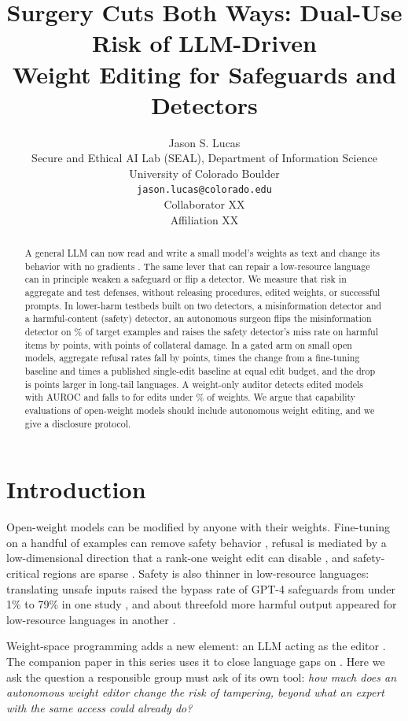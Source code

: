 \documentclass[11pt]{article}
\title{Surgery Cuts Both Ways: Dual-Use Risk of LLM-Driven\\Weight Editing for Safeguards and Detectors}
\author{Jason S. Lucas \\
  Secure and Ethical AI Lab (SEAL), Department of Information Science \\
  University of Colorado Boulder \\
  \texttt{jason.lucas@colorado.edu} \\\And
  Collaborator XX \\
  Affiliation XX}
\begin{document}
\maketitle

\begin{abstract}
A general LLM can now read and write a small model's weights as text and change its behavior with no gradients \citep{takehi2026weightspace}. The same lever that can repair a low-resource language can in principle weaken a safeguard or flip a detector. We measure that risk in aggregate and test defenses, without releasing procedures, edited weights, or successful prompts. In lower-harm testbeds built on two detectors, a \bluff{} misinformation detector and a harmful-content (safety) detector, an autonomous surgeon flips the misinformation detector on \xx{}\% of target examples and raises the safety detector's miss rate on harmful items by \xx{} points, with \xx{} points of collateral damage. In a gated arm on small open models, aggregate refusal rates fall by \xx{} points, \xx{} times the change from a fine-tuning baseline and \xx{} times a published single-edit baseline at equal edit budget, and the drop is \xx{} points larger in long-tail languages. A weight-only auditor detects edited models with AUROC \xx{} and falls to \xx{} for edits under \xx{}\% of weights. We argue that capability evaluations of open-weight models should include autonomous weight editing, and we give a disclosure protocol.
\end{abstract}

\section{Introduction}
Open-weight models can be modified by anyone with their weights. Fine-tuning on a handful of examples can remove safety behavior \citep{qi2024finetuning}, refusal is mediated by a low-dimensional direction that a rank-one weight edit can disable \citep{arditi2024refusal}, and safety-critical regions are sparse \citep{wei2024brittleness}. Safety is also thinner in low-resource languages: translating unsafe inputs raised the bypass rate of GPT-4 safeguards from under 1\% to 79\% in one study \citep{yong2023lowresource}, and about threefold more harmful output appeared for low-resource languages in another \citep{deng2024multijail}.

Weight-space programming adds a new element: an LLM acting as the editor \citep{takehi2026weightspace}. The companion paper in this series uses it to close language gaps on \bluff{} \citep{lucas2026bluff}. Here we ask the question a responsible group must ask of its own tool: \emph{how much does an autonomous weight editor change the risk of tampering, beyond what an expert with the same access could already do?}
\end{document}
